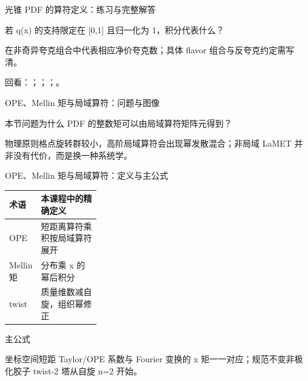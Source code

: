 \begin{frame}[t]{光锥 PDF 的算符定义：练习与完整解答}
\footnotesize
\begin{block}{}若 q(x) 的支持限定在 [0,1] 且归一化为 1，积分代表什么？\end{block}
\begin{exampleblock}{}在非奇异夸克组合中代表相应净价夸克数；具体 flavor 组合与反夸克约定需写清。\end{exampleblock}
\vfill
\scriptsize 回看：；；；。
\end{frame}

\begin{frame}[t]{OPE、Mellin 矩与局域算符：问题与图像}
\footnotesize
\begin{block}{本节问题}为什么 PDF 的整数矩可以由局域算符矩阵元得到？\end{block}
\begin{block}{物理原则}\quad 格点旋转群较小，高阶局域算符会出现幂发散混合；非局域 LaMET 并非没有代价，而是换一种系统学。\end{block}
\end{frame}

\begin{frame}[t]{OPE、Mellin 矩与局域算符：定义与主公式}
\footnotesize\begin{tabularx}{\linewidth}{p{0.30\linewidth}Y}
\toprule 术语 & 本课程中的精确定义\\\midrule
{} OPE & 短距离算符乘积按局域算符展开\\
 Mellin 矩 & 分布乘 x 的幂后积分\\
 twist & 质量维数减自旋，组织幂修正\\
\bottomrule\end{tabularx}\vspace{0.15cm}
\begin{block}{ 主公式}\centering{}\end{block}
坐标空间短距 Taylor/\allowbreak{}OPE 系数与 Fourier 变换的 x 矩一一对应；规范不变非极化胶子 twist-2 塔从自旋 n=2 开始。
\end{frame}

